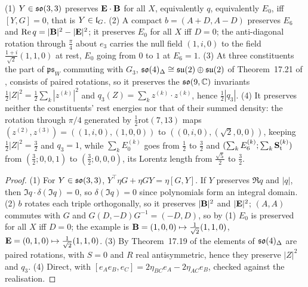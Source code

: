 \begin{proposition}
\label{d1:prop:bfield}
(1) $Y\in\mathfrak{so}(3,3)$ preserves $\mathbf E\cdot\mathbf B$ for all $X$, equivalently $q$, equivalently $E_0$, iff $[Y,G]=0$, that is $Y\in\mathfrak l_G$. (2) A compact
$b=(A+D,A-D)$ preserves $E_6$ and $\operatorname{Re} q=|\mathbf B|^2-|\mathbf E|^2$; it preserves $E_0$ for all $X$ iff $D=0$; the anti-diagonal rotation through $\tfrac\pi4$
about $e_3$ carries the null field $(1,i,0)$ to the field $\tfrac{1+i}{\sqrt2}(1,1,0)$ at rest, $E_0$ going from $0$ to $1$ at $E_6=1$. (3) At three
constituents the part of $\mathfrak{ps}_W$ commuting with $G_3$, $\mathfrak{so}(4)_\Delta\cong\mathfrak{su}(2)\oplus\mathfrak{su}(2)$ of Theorem~17.21 of \cite{ES17}, consists of paired
rotations, so it preserves the $\mathfrak{so}(9,\mathbb{C})$ invariants $\tfrac12|Z|^2=\tfrac12\sum_k|z^{(k)}|^2$ and $q_3(Z)=\sum_kz^{(k)}\cdot z^{(k)}$, hence $\tfrac12|q_3|$.
(4) It preserves neither the constituents' rest energies nor that of their summed density: the rotation through $\pi/4$ generated by
$\tfrac12\mathrm{rot}(7,13)$ maps $(z^{(2)},z^{(3)})=((1,i,0),(1,0,0))$ to $((0,i,0),(\sqrt2,0,0))$, keeping $\tfrac12|Z|^2=\tfrac32$ and $q_3=1$, while
$\sum_kE_0^{(k)}$ goes from $\tfrac12$ to $\tfrac32$ and $(\sum_kE_6^{(k)};\sum_k\mathbf S_{\rm t}^{(k)})$ from $(\tfrac32;0,0,1)$ to $(\tfrac32;0,0,0)$, its
Lorentz length from $\tfrac{\sqrt5}2$ to $\tfrac32$.
\end{proposition}

\begin{proof}
(1) For $Y\in\mathfrak{so}(3,3)$, $Y^{\!\top}\eta G+\eta GY=\eta[G,Y]$. If $Y$ preserves $\Re q$ and $|q|$, then $\Im q\cdot\delta(\Im q)=0$, so $\delta(\Im q)=0$ since
polynomials form an integral domain. (2) $b$ rotates each triple orthogonally, so it preserves $|\mathbf B|^2$ and $|\mathbf E|^2$; $(A,A)$ commutes with $G$ and
$G(D,-D)G^{-1}=(-D,D)$, so by (1) $E_0$ is preserved for all $X$ iff $D=0$; the example is $\mathbf B=(1,0,0)\mapsto\tfrac1{\sqrt2}(1,1,0)$,
$\mathbf E=(0,1,0)\mapsto\tfrac1{\sqrt2}(1,1,0)$. (3) By Theorem~17.19 of \cite{ES17} the elements of $\mathfrak{so}(4)_\Delta$ are paired rotations, with $S=0$ and $R$ real
antisymmetric, hence they preserve $|Z|^2$ and $q_3$. (4) Direct, with $[e_Ae_B,e_C]=2\eta_{BC}e_A-2\eta_{AC}e_B$, checked against the realisation.
\end{proof}

